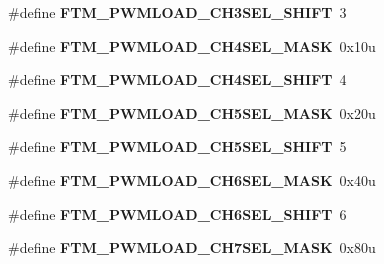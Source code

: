 \begin{DoxyCompactItemize}
\item 
\#define {\bfseries F\+T\+M\+\_\+\+P\+W\+M\+L\+O\+A\+D\+\_\+\+C\+H3\+S\+E\+L\+\_\+\+S\+H\+I\+FT}~3\hypertarget{group__FTM__Register__Masks_ga2af1a060bebe8e48c468cce81a2364d8}{}\label{group__FTM__Register__Masks_ga2af1a060bebe8e48c468cce81a2364d8}

\item 
\#define {\bfseries F\+T\+M\+\_\+\+P\+W\+M\+L\+O\+A\+D\+\_\+\+C\+H4\+S\+E\+L\+\_\+\+M\+A\+SK}~0x10u\hypertarget{group__FTM__Register__Masks_ga5c780b58f08500bc357b62c904dc1c97}{}\label{group__FTM__Register__Masks_ga5c780b58f08500bc357b62c904dc1c97}

\item 
\#define {\bfseries F\+T\+M\+\_\+\+P\+W\+M\+L\+O\+A\+D\+\_\+\+C\+H4\+S\+E\+L\+\_\+\+S\+H\+I\+FT}~4\hypertarget{group__FTM__Register__Masks_gafdff910b7b4bc4961ef1852efddacbb5}{}\label{group__FTM__Register__Masks_gafdff910b7b4bc4961ef1852efddacbb5}

\item 
\#define {\bfseries F\+T\+M\+\_\+\+P\+W\+M\+L\+O\+A\+D\+\_\+\+C\+H5\+S\+E\+L\+\_\+\+M\+A\+SK}~0x20u\hypertarget{group__FTM__Register__Masks_ga1b66f571d4fb653183ca2b59bcfeebce}{}\label{group__FTM__Register__Masks_ga1b66f571d4fb653183ca2b59bcfeebce}

\item 
\#define {\bfseries F\+T\+M\+\_\+\+P\+W\+M\+L\+O\+A\+D\+\_\+\+C\+H5\+S\+E\+L\+\_\+\+S\+H\+I\+FT}~5\hypertarget{group__FTM__Register__Masks_gac43e037a7c4b7b7d32dc52b11914d97f}{}\label{group__FTM__Register__Masks_gac43e037a7c4b7b7d32dc52b11914d97f}

\item 
\#define {\bfseries F\+T\+M\+\_\+\+P\+W\+M\+L\+O\+A\+D\+\_\+\+C\+H6\+S\+E\+L\+\_\+\+M\+A\+SK}~0x40u\hypertarget{group__FTM__Register__Masks_gaefdd87aac092c115ca16834df416a021}{}\label{group__FTM__Register__Masks_gaefdd87aac092c115ca16834df416a021}

\item 
\#define {\bfseries F\+T\+M\+\_\+\+P\+W\+M\+L\+O\+A\+D\+\_\+\+C\+H6\+S\+E\+L\+\_\+\+S\+H\+I\+FT}~6\hypertarget{group__FTM__Register__Masks_ga750eddbdde44f9f3a1a49cb8db15b7de}{}\label{group__FTM__Register__Masks_ga750eddbdde44f9f3a1a49cb8db15b7de}

\item 
\#define {\bfseries F\+T\+M\+\_\+\+P\+W\+M\+L\+O\+A\+D\+\_\+\+C\+H7\+S\+E\+L\+\_\+\+M\+A\+SK}~0x80u\hypertarget{group__FTM__Register__Masks_ga03933ee150a126784b19dde95dd28cc9}{}\label{group__FTM__Register__Masks_ga03933ee150a126784b19dde95dd28cc9}


\end{DoxyCompactItemize}

